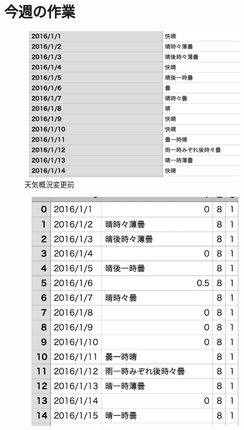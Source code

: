 %

\section{今週の作業}
\begin{itemize}

\begin{figure}[phb]
\centering
\includegraphics[scale=0.8]{replace_1.png}
\caption{天気概況変更前}
\end{figure}
\begin{figure}[phb]
\centering
\includegraphics[scale=0.8]{replace_2.png}

\end{figure}
\end{itemize}
